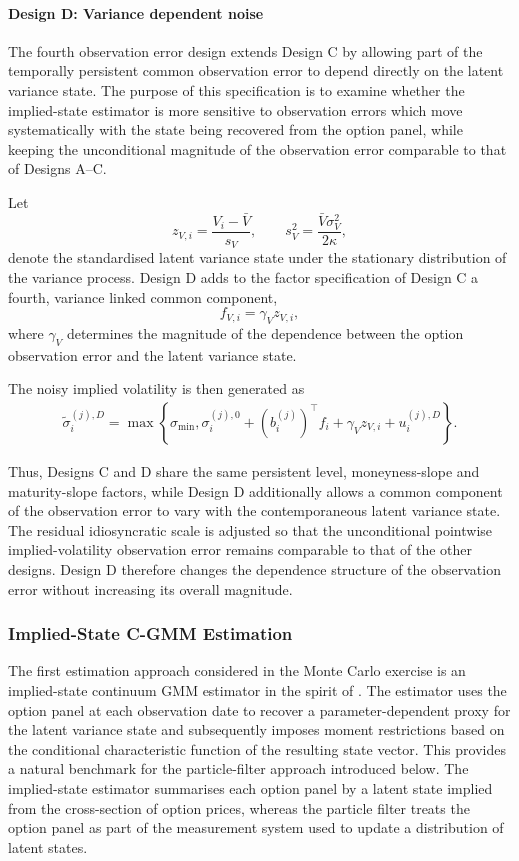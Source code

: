 \documentclass[11pt,a4paper,notitlepage]{article}
\numberwithin{equation}{section}
\begin{document}
\paragraph{Design D: Variance dependent noise}
The fourth observation error design extends Design C by allowing part of the temporally persistent common observation error to depend directly on the latent variance state. The purpose of this specification is to examine whether the implied-state estimator is more sensitive to observation errors which move systematically with the state being recovered from the option panel, while keeping the unconditional magnitude of the observation error comparable to that of Designs A--C.

Let
\[
z_{V,i}
=
\frac{V_i-\bar V}{s_V},
\qquad
s_V^2
=
\frac{\bar V\sigma_V^2}{2\kappa},
\]
denote the standardised latent variance state under the stationary distribution of the variance process. Design D adds to the factor specification of Design C a fourth, variance linked common component,
\[
f_{V,i}
=
\gamma_V z_{V,i},
\]
where $\gamma_V$ determines the magnitude of the dependence between the option observation error and the latent variance state.

The noisy implied volatility is then generated as
\begin{align}
\tilde\sigma_i^{(j),D}
=
\max\left\{
\sigma_{\min},
\sigma_i^{(j),0}
+
\left(b_i^{(j)}\right)^\top f_i
+
\gamma_V z_{V,i}
+
u_i^{(j),D}
\right\}.
\label{eq:state_dependent_iv_noise}
\end{align}

Thus, Designs C and D share the same persistent level, moneyness-slope and maturity-slope factors, while Design D additionally allows a common component of the observation error to vary with the contemporaneous latent variance state. The residual idiosyncratic scale is adjusted so that the unconditional pointwise implied-volatility observation error remains comparable to that of the other designs. Design D therefore changes the dependence structure of the observation error without increasing its overall magnitude.


\subsubsection{Implied-State C-GMM Estimation}
\label{sec:is_cgmm_estimation}

The first estimation approach considered in the Monte Carlo exercise is an implied-state continuum GMM estimator in the spirit of \citet{boswijk2015asset}. The estimator uses the option panel at each observation date to recover a parameter-dependent proxy for the latent variance state and subsequently imposes moment restrictions based on the conditional characteristic function of the resulting state vector. This provides a natural benchmark for the particle-filter approach introduced below. The implied-state estimator summarises each option panel by a latent state implied from the cross-section of option prices, whereas the particle filter treats the option panel as part of the measurement system used to update a distribution of latent states.
\end{document}
